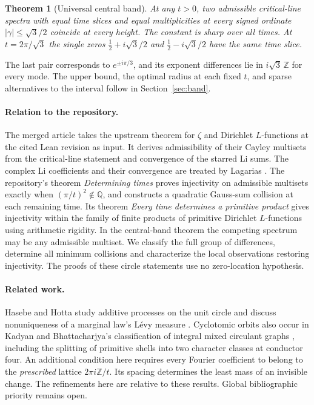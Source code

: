 \documentclass[11pt,letterpaper]{article}
\newtheorem{theorem}{Theorem}[section]
\newcommand{\Z}{\mathbb Z}
\newcommand{\Q}{\mathbb Q}
\begin{document}
\begin{theorem}[Universal central band]\label{thm:central}
At any $t>0$, two admissible critical-line spectra with equal time slices and equal multiplicities at every signed ordinate $|\gamma|\le\sqrt3/2$ coincide at every height. The constant is sharp over all times. At $t=2\pi/\sqrt3$ the single zeros $\tfrac12+i\sqrt3/2$ and $\tfrac12-i\sqrt3/2$ have the same time slice.
\end{theorem}
The last pair corresponds to $e^{\pm i\pi/3}$, and its exponent differences lie in $i\sqrt3\,\Z$ for every mode. The upper bound, the optimal radius at each fixed $t$, and sparse alternatives to the interval follow in Section~\ref{sec:band}.

\paragraph{Relation to the repository.}
The merged article takes the upstream theorem for $\zeta$ and Dirichlet $L$-functions at the cited Lean revision as input. It derives admissibility of their Cayley multisets from the critical-line statement and convergence of the starred Li sums. The complex Li coefficients and their convergence are treated by Lagarias \cite{LagariasLi}. The repository's theorem \emph{Determining times} proves injectivity on admissible multisets exactly when $(\pi/t)^2\notin\Q$, and constructs a quadratic Gauss-sum collision at each remaining time. Its theorem \emph{Every time determines a primitive product} gives injectivity within the family of finite products of primitive Dirichlet $L$-functions using arithmetic rigidity. In the central-band theorem the competing spectrum may be any admissible multiset. We classify the full group of differences, determine all minimum collisions and characterize the local observations restoring injectivity. The proofs of these circle statements use no zero-location hypothesis.

\paragraph{Related work.}
Hasebe and Hotta study additive processes on the unit circle and discuss nonuniqueness of a marginal law's L\'evy measure \cite{hh}. Cyclotomic orbits also occur in Kadyan and Bhattacharjya's classification of integral mixed circulant graphs \cite{kb}, including the splitting of primitive shells into two character classes at conductor four. An additional condition here requires every Fourier coefficient to belong to the \emph{prescribed} lattice $2\pi i\Z/t$. Its spacing determines the least mass of an invisible change. The refinements here are relative to these results. Global bibliographic priority remains open.
\end{document}
